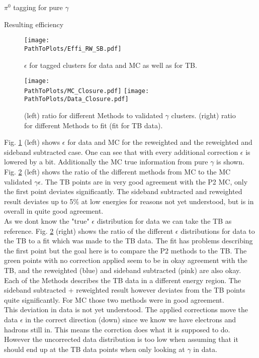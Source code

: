 \documentclass[ALICE]{ALICE_analysis_notes}
\newcommand{\g}{$\gamma$\xspace}
\newcommand{\PathToPlots}{/home/joshua/PCG_Software/EMCal_NCellEffi/13TeVNomB_Wide/Pi0Tagging_13TeV_nom_04_26_WithTRD_WithBorderCells_1cellFT/pdf}
\begin{document}
\begin{section}{$\pi^{0}$ tagging for pure $\gamma$}
\begin{subsection}{Resulting efficiency}
\begin{figure}[h!]
	\centering
	\texttt{[image: \\PathToPlots/Effi\_RW\_SB.pdf]}
	
	\caption{  $\epsilon$ for tagged clusters for data and MC as well as for TB.}
	\label{fig:NCellEff_Tagging2}
	
\end{figure}

\begin{figure}[h!]
	\centering
	\texttt{[image: \\PathToPlots/MC\_Closure.pdf]}	
	\texttt{[image: \\PathToPlots/Data\_Closure.pdf]}	
	\caption{ (left) ratio for different Methods to validated \g clusters. (right) ratio for different Methods to fit (fit for TB data).}
	\label{fig:NCellEff_Tagging_Closure}
	
\end{figure}

	Fig. \ref{fig:NCellEff_Tagging2} (left) shows $\epsilon$ for data and MC for the reweighted and the reweighted and sideband subtracted case. One can see that with every additional correction $\epsilon$ is lowered by a bit. Additionally the MC true information from pure \g is shown.\\
	Fig. \ref{fig:NCellEff_Tagging_Closure} (left) shows the ratio of the different methods from MC to the MC validated \g $\epsilon$. The TB points are in very good agreement with the P2 MC, only the first point deviates significantly. The sideband subtracted and reweighted result deviates up to 5\% at low energies for reasons not yet understood, but is in overall in quite good agreement.\\
	As we dont know the "true" $\epsilon$ distribution for data we can take the TB as reference. Fig. \ref{fig:NCellEff_Tagging_Closure} (right) shows the ratio of the different $\epsilon$ distributions for data to the TB to a fit which was made to the TB data. The fit has problems describing the first point but the goal here is to compare the P2 methods to the TB. The green points with no correction applied seem to be in okay agreement with the TB, and the reweighted (blue) and sideband subtracted (pink) are also okay. Each of the Methods describes the TB data in a different energy region. The sideband subtracted + reweighted result however deviates from the TB points quite significantly. For MC those two methods were in good agreement.\\
	This deviation in data is not yet understood. The applied corrections move the data $\epsilon$ in the correct direction (down) since we know we have electrons and hadrons still in. This means the corrction does what it is supposed to do. However the uncorrected data distribution is too low when assuming that it should end up at the TB data points when only looking at \g in data.
	

\end{subsection}
\end{section}
\end{document}
